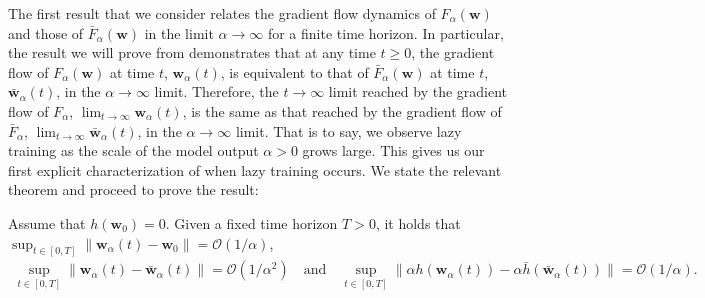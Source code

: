 \documentclass{article}
\newenvironment{manualtheorem}[1]{%
  \renewcommand\themanualtheoreminner{#1}%
  \manualtheoreminner
}{\endmanualtheoreminner}
\begin{document}
The first result that we consider relates the gradient flow dynamics of $F_{\alpha}(\boldsymbol{w})$ and those of $\bar{F}_{\alpha}(\boldsymbol{w})$ in the limit $\alpha \rightarrow \infty$ for a finite time horizon. In particular, the result we will prove from \cite{chizat2018lazy} demonstrates that at any time $t \geq 0$, the gradient flow of $F_{\alpha}(\boldsymbol{w})$ at time $t$, $\boldsymbol{w}_{\alpha}(t)$, is equivalent to that of $\bar{F}_{\alpha}(\boldsymbol{w})$ at time $t$, $\boldsymbol{\bar{w}}_{\alpha}(t)$, in the  $\alpha \rightarrow \infty$ limit. Therefore, the $t \rightarrow \infty$ limit reached by the gradient flow of $F_{\alpha}$, $\lim_{t \to \infty} \boldsymbol{w}_{\alpha}(t)$, is the same as that reached by the gradient flow of $\bar{F}_{\alpha}$, $\lim_{t \to \infty} \boldsymbol{\bar{w}}_{\alpha}(t)$, in the $\alpha \rightarrow \infty$ limit. That is to say, we observe lazy training as the scale of the model output $\alpha > 0$ grows large. This gives us our first explicit characterization of when lazy training occurs. We state the relevant theorem and proceed to prove the result:

\begin{manualtheorem}{2.2}[from \cite{chizat2018lazy}]\label{finitehorizon}
Assume that $h(\boldsymbol{w}_0) = 0$. Given a fixed time horizon $T > 0$, it holds that $\sup_{t \in [0, T]} \| \boldsymbol{w}_{\alpha}(t) - \boldsymbol{w}_0 \| = \mathcal{O}(1/\alpha)$,
\begin{align*}
    \sup_{t \in [0, T]} \| \boldsymbol{w}_{\alpha}(t) - \boldsymbol{\bar{w}}_{\alpha}(t) \| = \mathcal{O}(1/\alpha^2) \quad \text{and} \quad \sup_{t \in [0, T]} \| \alpha h(\boldsymbol{w}_{\alpha}(t)) - \alpha \bar{h}(\boldsymbol{\bar{w}}_{\alpha}(t)) \| = \mathcal{O}(1/\alpha).
\end{align*}
\end{manualtheorem}
\end{document}
